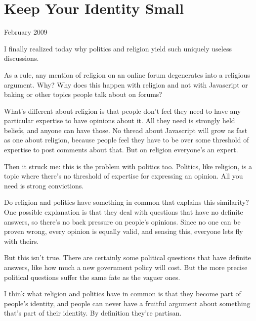 \chapter{Keep Your Identity Small}


            
              
                

February 2009

I finally realized today why
                  politics and religion yield such uniquely useless
                  discussions.

As a rule, any mention of religion on
                  an online forum degenerates into a religious argument. Why?
                  Why does this happen with religion and not with Javascript or
                  baking or other topics people talk about on forums?

What's
                  different about religion is that people don't feel they need
                  to have any particular expertise to have opinions about it.
                  All they need is strongly held beliefs, and anyone can have
                  those. No thread about Javascript will grow as fast as one
                  about religion, because people feel they have to be over some
                  threshold of expertise to post comments about that. But on
                  religion everyone's an expert.

Then it struck me:
                  this is the problem with politics too. Politics, like
                  religion, is a topic where there's no threshold of expertise
                  for expressing an opinion. All you need is strong
                  convictions.

Do religion and politics have
                  something in common that explains this similarity? One
                  possible explanation is that they deal with questions that
                  have no definite answers, so there's no back pressure on
                  people's opinions. Since no one can be proven wrong, every
                  opinion is equally valid, and sensing this, everyone lets fly
                  with theirs.

But this isn't true. There are
                  certainly some political questions that have definite answers,
                  like how much a new government policy will cost. But the more
                  precise political questions suffer the same fate as the vaguer
                  ones.

I think what religion and politics have in
                  common is that they become part of people's identity, and
                  people can never have a fruitful argument about something
                  that's part of their identity. By definition they're
                  partisan.

